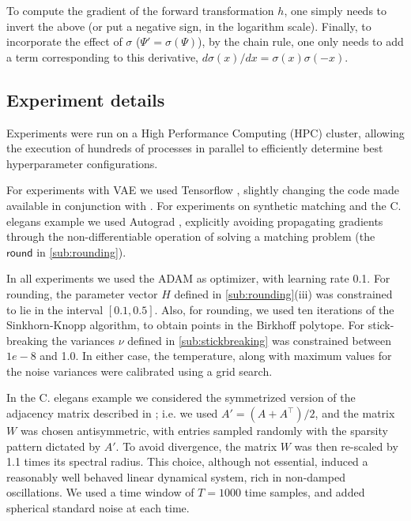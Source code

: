 \documentclass[twoside]{article}
\begin{document}
To compute the gradient of the forward transformation $h$, one simply needs to invert the above (or put a negative sign, in the logarithm scale). Finally,  to incorporate the effect of $\sigma$ ($\Psi'=\sigma(\Psi)$), by the chain rule,  one only needs to add a term corresponding to this derivative, $d\sigma(x)/dx=\sigma(x)\sigma(-x)$. 
\subsection*{Experiment details}

Experiments were run on a High Performance Computing (HPC) cluster, allowing the execution of hundreds of processes in parallel to efficiently determine best hyperparameter configurations.

For experiments with VAE we used Tensorflow \citep{Abadi2016}, slightly changing the code made available in conjunction with \cite{jang2016categorical}. For experiments on synthetic matching and the C. elegans example we used Autograd  \citep{maclaurin2015autograd}, explicitly avoiding propagating gradients through the non-differentiable operation of solving a matching problem (the $\mathsf{round}$ in \ref{sub:rounding}).

In all experiments we used the ADAM as optimizer, with learning rate 0.1. For rounding, the parameter vector $H$ defined in \ref{sub:rounding}(iii) was constrained to lie in the interval $[0.1, 0.5]$. Also, for rounding, we used ten iterations of the Sinkhorn-Knopp algorithm, to obtain points in the Birkhoff polytope. For stick-breaking the variances $\nu$ defined in \ref{sub:stickbreaking} was constrained between $1e-8$ and 1.0. In either case, the temperature, along with maximum values for the noise variances were calibrated using a grid search.
 
In the C. elegans example we considered the symmetrized version of the adjacency matrix described in \citep{varshney2011structural}; i.e. we used $A'=(A+A^\top)/2$, and the matrix $W$ was chosen antisymmetric, with entries sampled randomly with the sparsity pattern dictated by $A'$. To avoid divergence, the matrix $W$ was then re-scaled by 1.1 times its spectral radius. This choice, although not essential, induced a reasonably well behaved linear dynamical system, rich in non-damped oscillations. We used a time window of $T=1000$ time samples, and added spherical standard noise at each time. 




\end{document}
